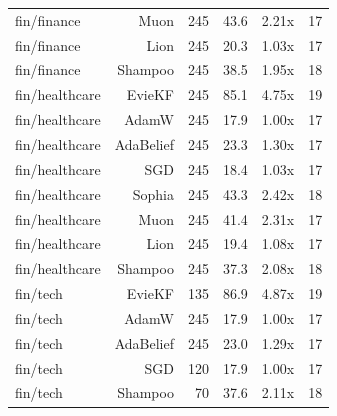 \begin{table}[t]
\begin{tabular}{lrrrrr}
fin/finance & Muon & 245 & 43.6 & 2.21x & 17 \\
fin/finance & Lion & 245 & 20.3 & 1.03x & 17 \\
fin/finance & Shampoo & 245 & 38.5 & 1.95x & 18 \\
fin/healthcare & EvieKF & 245 & 85.1 & 4.75x & 19 \\
fin/healthcare & AdamW & 245 & 17.9 & 1.00x & 17 \\
fin/healthcare & AdaBelief & 245 & 23.3 & 1.30x & 17 \\
fin/healthcare & SGD & 245 & 18.4 & 1.03x & 17 \\
fin/healthcare & Sophia & 245 & 43.3 & 2.42x & 18 \\
fin/healthcare & Muon & 245 & 41.4 & 2.31x & 17 \\
fin/healthcare & Lion & 245 & 19.4 & 1.08x & 17 \\
fin/healthcare & Shampoo & 245 & 37.3 & 2.08x & 18 \\
fin/tech & EvieKF & 135 & 86.9 & 4.87x & 19 \\
fin/tech & AdamW & 245 & 17.9 & 1.00x & 17 \\
fin/tech & AdaBelief & 245 & 23.0 & 1.29x & 17 \\
fin/tech & SGD & 120 & 17.9 & 1.00x & 17 \\
fin/tech & Shampoo & 70 & 37.6 & 2.11x & 18 \\
\bottomrule
\end{tabular}
\end{table}
